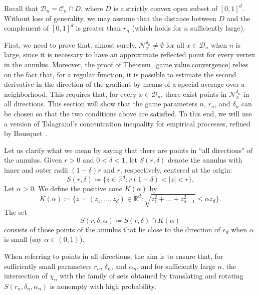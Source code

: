 \documentclass[11pt]{amsart}
\theoremstyle{definition}
\theoremstyle{remark}
\numberwithin{equation}{section}
\newcommand{\R}{{\mathbb R}}
\newcommand{\Domain}{\mathcal{D}}
\newcommand{\C}{{\mathcal C}}
\newcommand{\Nc}{{\mathcal N}}
\begin{document}
Recall that $\Domain_n = \C_n \cap D$, where $D$ is a strictly convex open subset of $[0,1]^d$. 
Without loss of generality, we may assume that the distance between $D$ and the complement of $[0,1]^d$ is greater than $r_n$ (which holds for $n$ sufficiently large).

First, we need to prove that, almost surely, $\Nc_{x}^{\delta_n} \neq \emptyset$ for all $x\in\Domain_n$ when $n$ is large, since it is necessary to have an approximate reflected point for every vertex in the annulus. 
Moreover, the proof of Theorem~\ref{game.value.convergence} relies on the fact that, for a regular function, it is possible to estimate the second derivative in the direction of the gradient by means of a special average over a neighborhood. 
This requires that, for every $x \in \Domain_n$, there exist points in $\Nc_{x}^{\delta_n}$ in all directions. 
This section will show that the game parameters $n$, $r_n$, and $\delta_n$ can be chosen so that the two conditions above are satisfied. 
To this end, we will use a version of Talagrand's concentration inequality for empirical processes, refined by Bousquet~\cite{Bousquet2002}.


Let us clarify what we mean by saying that there are points in ``all directions" of the annulus. 
Given $r>0$ and $0<\delta<1$, let $S(r,\delta)$ denote the annulus with inner and outer radii $(1-\delta)r$ and $r$, respectively, centered at the origin:
\begin{equation}
S(r,\delta)
\coloneqq
\{z\in \R^d : r(1-\delta)<|z|<r\}.
\end{equation}
Let $\alpha>0$.  
We define the positive cone $K(\alpha)$ by
\begin{equation}
K(\alpha) 
\coloneqq
\{z = (z_1,\dots,z_d) \in \R^d : \sqrt{z_1^2 + \dots + z_{d-1}^2} \leq \alpha z_d\}.
\end{equation}
The set
\begin{equation}
S(r,\delta,\alpha) \coloneqq S(r,\delta) \cap K(\alpha)
\end{equation}
consists of those points of the annulus that lie close to the direction of $e_d$ when $\alpha$ is small (say $\alpha \in (0,1)$).  

When referring to points in all directions, the aim is to ensure that, for sufficiently small parameters $r_n$, $\delta_n$, and $\alpha_n$, and for sufficiently large $n$, the intersection of $\chi_n$ with the family of sets obtained by translating and rotating $S(r_n,\delta_n,\alpha_n)$ is nonempty with high probability.
\end{document}
